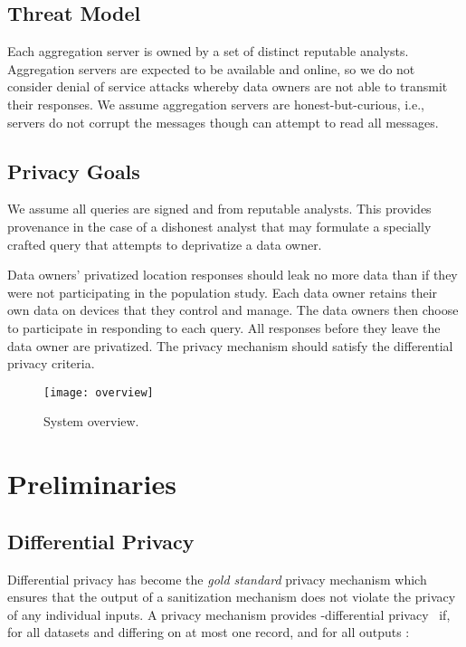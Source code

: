 \documentclass[conference]{IEEEtran}
\begin{document}
\subsection{Threat Model}

Each aggregation server is owned by a set of distinct reputable analysts. Aggregation servers are expected to be available and online, so we do not consider denial of service attacks whereby data owners are not able to transmit their responses. We assume aggregation servers are honest-but-curious, i.e., servers do not corrupt the messages though can attempt to read all messages.

\subsection{Privacy Goals}

We assume all queries are signed and from reputable analysts. This provides provenance in the case of a dishonest analyst that may formulate a specially crafted query that attempts to deprivatize a data owner.

Data owners' privatized location responses should leak no more data than if they were not participating in the population study. Each data owner retains their own data on devices that they control and manage. The data owners then choose to participate in responding to each query. All responses before they leave the data owner are privatized. The privacy mechanism should satisfy the differential privacy criteria. 


\begin{figure}[t!]
\centering
\texttt{[image: overview]}
\caption{System overview.}
\label{fig:systemoverview}
\end{figure}
 \section{Preliminaries}

\subsection{Differential Privacy}

Differential privacy has become the \emph{gold standard} privacy mechanism which ensures that the output of a sanitization mechanism does not violate the privacy of any individual inputs.  A privacy mechanism  provides -differential privacy~\cite{DBLP:conf/icalp/Dwork06,DBLP:conf/tcc/DworkMNS06} if, for all datasets  and  differing on at most one record, and for all outputs :
\end{document}
